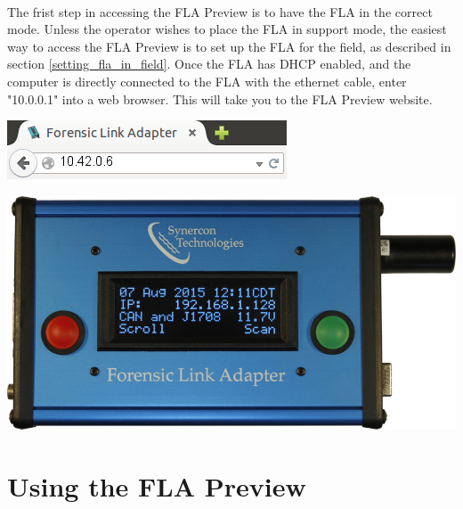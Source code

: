 \documentclass[11pt, oneside]{book}
\begin{document}
\paragraph{  }
The frist step in accessing the FLA Preview is to have the FLA in the correct mode. Unless the operator wishes to place the FLA in support mode, the easiest way to access the FLA Preview is to set up the FLA for the field, as described in section \ref{setting_fla_in_field}. Once the FLA has DHCP enabled, and the computer is directly connected to the FLA with the ethernet cable, enter "10.0.0.1" into a web browser. This will take you to the FLA Preview website.
\\[\baselineskip]
\noindent\begin{minipage}{0.45\textwidth}%
	\includegraphics[width=\linewidth]{../media/fla_preview_screenshots/url_correct_dhcp} 
\end{minipage}%
\hfill%
\begin{minipage}{0.45\textwidth} 
	\includegraphics[width=\linewidth]{../media/fla_screens/ethernet_and_others/main/title_both}
\end{minipage}
\section{Using the FLA Preview}
\end{document}
